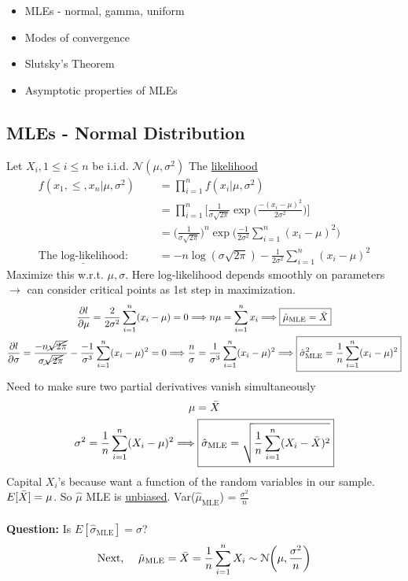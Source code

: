 \begin{itemize}
	\item MLEs - normal, gamma, uniform
	\item Modes of convergence
	\item Slutsky's Theorem
	\item Asymptotic properties of MLEs
\end{itemize}
\subsection*{MLEs - Normal Distribution}
Let $X_i, 1 \leq i \leq n$ be i.i.d. $\mathcal{N}(\mu, \sigma^2)$ The \underline{likelihood}
\begin{align*}
	f(x_1, \leq, x_n | \mu, \sigma^2) & = \prod_{i=1}^n f(x_i | \mu, \sigma^2)\\
	& = \prod_{i=1}^n \bigg[ \frac{1}{\sigma \sqrt{2\pi}} \exp \bigg( \frac{-(x_i - \mu)^2}{2\sigma^2} \bigg) \bigg]\\
	& = \bigg( \frac{1}{\sigma \sqrt{2\pi}} \bigg)^n \exp \bigg(\frac{-1}{2\sigma^2}  \sum_{i=1}^n (x_i - \mu)^2\bigg)\\
	\underline{\text{The log-likelihood:}} \qquad & = -n \log (\sigma \sqrt{2\pi}) - \frac{1}{2\sigma^2} \sum_{i=1}^n (x_i - \mu)^2
\end{align*}
Maximize this w.r.t. $\mu, \sigma$. Here log-likelihood depends smoothly on parameters $\rightarrow$ can consider critical points as 1st step in maximization.
\begin{gather*}
	\frac{\partial l}{\partial \mu} = \frac{2}{2\sigma^2} \sum_{i=1}^n (x_i - \mu) = 0 \Longrightarrow n\mu = \sum_{i=1}^n x_i \Longrightarrow \boxed{\hat{\mu}_{\text{MLE}} = \bar{X}}\\
	\frac{\partial l}{\partial \sigma} = \frac{-n \cancel{\sqrt{2\pi}}}{\sigma \cancel{\sqrt{2\pi}}} - \frac{-1}{\sigma^3} \sum_{i=1}^n (x_i - \mu)^2 = 0 \Longrightarrow \frac{n}{\sigma} = \frac{1}{\sigma^3} \sum_{i=1}^n (x_i - \mu)^2 \Longrightarrow \boxed{\hat{\sigma}_{\text{MLE}}^2 = \frac{1}{n} \sum_{i=1}^n (x_i - \mu)^2}
\end{gather*}
Need to make sure two partial derivatives vanish simultaneously
\begin{gather*}
	\mu = \bar{X}\\
	\sigma^2 = \frac{1}{n} \sum_{i=1}^n (X_i - \mu)^2 \Longrightarrow \boxed{\hat{\sigma}_{\text{MLE}} = \sqrt{\frac{1}{n} \sum_{i=1}^n (X_i - \bar{X})^2}}
\end{gather*}
Capital $X_i$'s because want a function of the random variables in our sample. $E[\bar{X}] = \mu$. So $\hat{\mu}$ MLE is \underline{unbiased}. Var($\hat{\mu}_{\text{MLE}}$) = $\frac{\sigma^2}{n}$\\\\
\textbf{Question:} Is $E[\hat{\sigma}_{\text{MLE}}] = \sigma$?
\begin{equation*}
	\text{Next, } \quad \hat{\mu}_{\text{MLE}} = \bar{X} = \frac{1}{n} \sum_{i=1}^n X_i \sim \mathcal{N}\bigg(\mu, \frac{\sigma^2}{n} \bigg)
\end{equation*}

